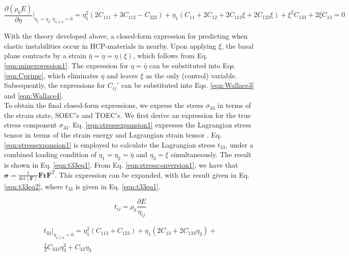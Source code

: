 \documentclass[showpacs,aps,floatfix,prb,reprint,superscriptaddress]{revtex4-1}
\begin{document}
\begin{widetext}
\begin{equation}
\label{eqn:minexpression1}
\frac{\partial \left(\rho_{0} E\right)}{\partial \eta} |_{\eta_{1}=\eta_{2}, \eta_{4,5,6}=0} = \eta_{1}^{2} \left(2C_{111} + 3C_{112} - C_{222} \right) + \eta_{1} \left(C_{11} + 2C_{12} + 2C_{113} \xi + 2C_{123} \xi \right) + \xi^{2} C_{133} + 2\xi C_{13} = 0
\end{equation}
\end{widetext} 

With the theory developed above, a closed-form expression for predicting when elastic instabilities occur in HCP-materials in nearby. Upon applying $\xi$, the basal plane contracts by a strain $\bar{\eta} = \eta = \eta(\xi)$, which follows from Eq. \ref{eqn:minexpression1}. The expression for $\eta = \bar{\eta}$ can be substituted into Eqs. \ref{eqn:Cprime}, which eliminates $\eta$ and leaves $\xi$ as the only (control) variable. Subsequently, the expressions for $C_{ij}'$ can be substituted into Eqs. \ref{eqn:Wallace3} and \ref{eqn:Wallace4}. \\

To obtain the final closed-form expressions, we express the stress $\sigma_{33}$ in terms of the strain state, SOEC's and TOEC's. We first derive an expression for the true stress component $\sigma_{33}$. Eq. \ref{eqn:stressexpansion1} expresses the Lagrangian stress tensor in terms of the strain energy and Lagrangian strain tensor \cite{lopuszynski2007ab}. Eq. \ref{eqn:stressexpansion1} is employed to calculate the Lagrangian stress $t_{33}$, under a combined loading condition of $\eta_{1}=\eta_{2}=\bar{\eta}$ and $\eta_{3}=\xi$ simultaneously. The result is shown in Eq. \ref{eqn:t33eq1}. From Eq. \ref{eqn:stressconversion1}, we have that $\bm{\sigma} = \frac{1}{\text{det} \left(\bm{F}\right)} \bm{F} \bm{t} \bm{F}^{T}$. This expression can be expanded, with the result given in Eq. \ref{eqn:t33eq2}, where $t_{33}$ is given in Eq. \ref{eqn:t33eq1}. 


\begin{equation}
\label{eqn:stressexpansion1} 
t_{ij} = \rho_{0} \frac{\partial E}{\eta_{ij}}
\end{equation}

\begin{multline}
\label{eqn:t33eq1} 
t_{33} |_{\eta_{4,5,6} = 0} = \eta_{1}^{2} \left(C_{113} + C_{123} \right) + \eta_{1} \left(2C_{13} + 2C_{133}\eta_{3} \right) + \\ \frac{1}{2} C_{333} \eta_{3}^{2} + C_{33} \eta_{3}
\end{multline}
\end{document}
